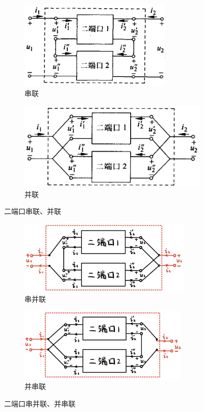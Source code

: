 \documentclass[UTF8]{report}
\theoremstyle{MyLineTheoremStyle} %
\theoremstyle{MyBlockTheoremStyle} %
\theoremstyle{MySubsubsectionStyle} %
\begin{document}
\begin{figure}[H]\centering
\begin{subfigure}[t]{0.46\textwidth}\centering
    \includegraphics[height=120pt]{assets/2/串联.png}
    \caption{ 串联 }
\end{subfigure}\begin{subfigure}[t]{0.54\textwidth}\centering
    \includegraphics[height=120pt]{assets/2/并联.png}
    \caption{ 并联 }
\end{subfigure}
\caption{ 二端口串联、并联 }
\end{figure}

\begin{figure}[H]\centering
\begin{subfigure}[t]{0.5\textwidth}\centering
    \includegraphics[height=100pt]{assets/2/串并联.png}
    \caption{ 串并联 }
\end{subfigure}\begin{subfigure}[t]{0.5\textwidth}\centering
    \includegraphics[height=100pt]{assets/2/并串联.png}
    \caption{ 并串联 }
\end{subfigure}
\caption{ 二端口串并联、并串联 }
\end{figure}
\end{document}
